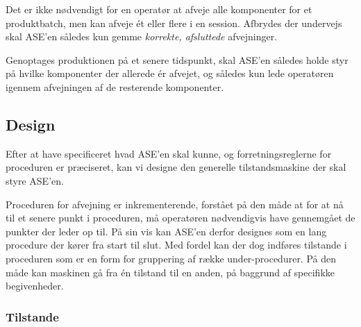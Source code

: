 \documentclass[a4paper]{article}
\begin{document}
Det er ikke nødvendigt for en operatør at afveje alle komponenter for et produktbatch, men kan afveje ét eller flere i en session. Afbrydes der undervejs skal ASE'en således kun gemme \emph{korrekte, afsluttede} afvejninger.

Genoptages produktionen på et senere tidspunkt, skal ASE'en således holde styr på hvilke komponenter der allerede ér afvejet, og således kun lede operatøren igennem afvejningen af de resterende komponenter.



\subsection{Design} %

Efter at have specificeret hvad ASE'en skal kunne, og forretningsreglerne for proceduren er præciseret, kan vi designe den generelle tilstandsmaskine der skal styre ASE'en.

Proceduren for afvejning er inkrementerende, forstået på den måde at for at nå til et senere punkt i proceduren, må operatøren nødvendigvis have gennemgået de punkter der leder op til. På sin vis kan ASE'en derfor designes som en lang procedure der kører fra start til slut. Med fordel kan der dog indføres tilstande i proceduren som er en form for gruppering af række under-procedurer. På den måde kan maskinen gå fra én tilstand til en anden, på baggrund af specifikke begivenheder.

\subsubsection{Tilstande} %
\end{document}
